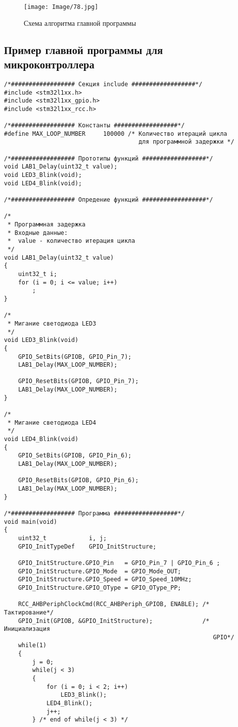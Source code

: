 \begin{figure}[H]
\begin{center}
\texttt{[image: Image/78.jpg]} 
\end{center}
\caption{Схема алгоритма главной программы}
\end{figure}

\subsection{Пример главной программы для микроконтроллера}
\begin{verbatim}
/*################## Секция include ##################*/
#include <stm32l1xx.h>
#include <stm32l1xx_gpio.h>
#include <stm32l1xx_rcc.h>

/*################## Константы ##################*/ 
#define MAX_LOOP_NUMBER     100000 /* Количество итераций цикла 
                                      для программной задержки */

/*################## Прототипы функций ##################*/
void LAB1_Delay(uint32_t value);    
void LED3_Blink(void);              
void LED4_Blink(void);              

/*################## Опредение функций ##################*/

/*
 * Программная задержка
 * Входные данные:
 *  value - количество итерация цикла
 */
void LAB1_Delay(uint32_t value)
{
    uint32_t i;
    for (i = 0; i <= value; i++)
        ;
}

/*
 * Мигание светодиода LED3
 */
void LED3_Blink(void)
{
    GPIO_SetBits(GPIOB, GPIO_Pin_7);
    LAB1_Delay(MAX_LOOP_NUMBER);

    GPIO_ResetBits(GPIOB, GPIO_Pin_7);
    LAB1_Delay(MAX_LOOP_NUMBER);
}

/*
 * Мигание светодиода LED4
 */
void LED4_Blink(void) 
{
    GPIO_SetBits(GPIOB, GPIO_Pin_6);
    LAB1_Delay(MAX_LOOP_NUMBER);

    GPIO_ResetBits(GPIOB, GPIO_Pin_6);
    LAB1_Delay(MAX_LOOP_NUMBER);
}

/*################## Программа ##################*/
void main(void)
{
    uint32_t            i, j;
    GPIO_InitTypeDef    GPIO_InitStructure;             

    GPIO_InitStructure.GPIO_Pin   = GPIO_Pin_7 | GPIO_Pin_6 ;
    GPIO_InitStructure.GPIO_Mode  = GPIO_Mode_OUT;
    GPIO_InitStructure.GPIO_Speed = GPIO_Speed_10MHz;
    GPIO_InitStructure.GPIO_OType = GPIO_OType_PP;
    
    RCC_AHBPeriphClockCmd(RCC_AHBPeriph_GPIOB, ENABLE); /* Тактирование*/
    GPIO_Init(GPIOB, &GPIO_InitStructure);              /* Инициализация 
                                                           GPIO*/
    while(1)
    {
        j = 0;
        while(j < 3)
        {
            for (i = 0; i < 2; i++)
                LED3_Blink();
            LED4_Blink();
            j++;
        } /* end of while(j < 3) */


\end{verbatim}
